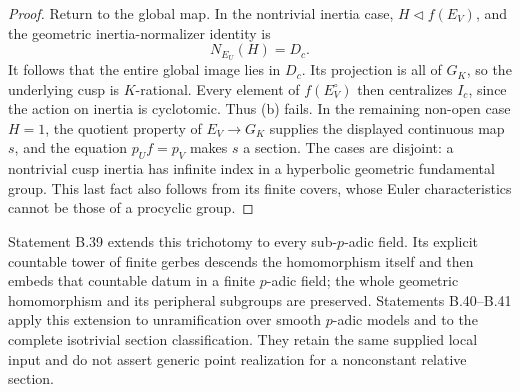 \documentclass[11pt,oneside]{article}
\begin{document}
\begin{proof}
Return to the global map. In the nontrivial inertia case,
$H\triangleleft f(E_V)$, and the geometric inertia-normalizer
identity is
\[
 N_{E_U}(H)=D_c.
\]
It follows that the entire global image lies in $D_c$. Its
projection is all of $G_K$, so the underlying cusp is
$K$-rational. Every element of $f(E_V^\circ)$ then centralizes
$I_c$, since the action on inertia is cyclotomic. Thus (b)
fails. In the remaining non-open case $H=1$, the quotient
property of $E_V\to G_K$ supplies the displayed continuous
map $s$, and the equation $p_Uf=p_V$ makes $s$ a section.
The cases are disjoint: a nontrivial cusp inertia has infinite
index in a hyperbolic geometric fundamental group. This last
fact also follows from its finite covers, whose Euler
characteristics cannot be those of a procyclic group.
\end{proof}

Statement B.39 extends this trichotomy to every sub-$p$-adic
field. Its explicit countable tower of finite gerbes descends
the homomorphism itself and then embeds that countable datum
in a finite $p$-adic field; the whole geometric homomorphism
and its peripheral subgroups are preserved. Statements
B.40--B.41 apply this extension to unramification over smooth
$p$-adic models and to the complete isotrivial section
classification. They retain the same supplied local input
and do not assert generic point realization for a nonconstant
relative section.
\end{document}
